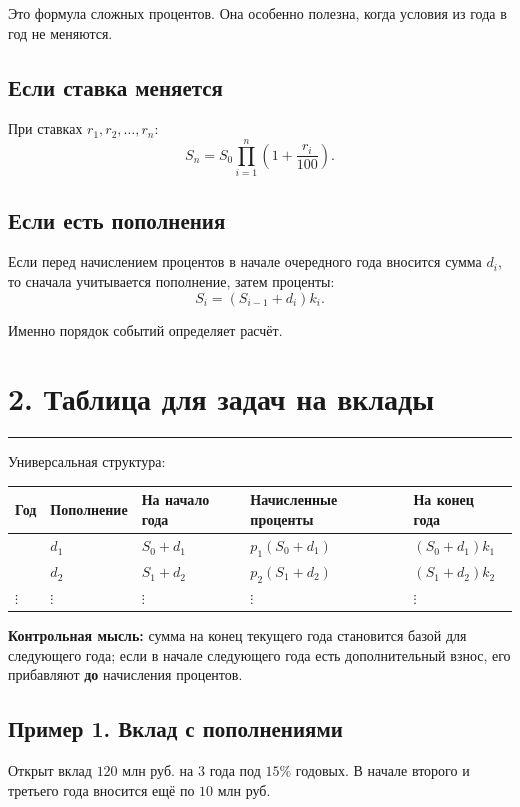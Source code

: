 \documentclass[a4paper,12pt]{article}
\newcommand{\sectionline}{\vspace{-0.4em}\textcolor{linegray}{\rule{\linewidth}{0.5pt}}\vspace{0.35em}}
\newcommand{\key}[1]{\textcolor{darkaccent}{\textbf{#1}}}
\begin{document}
Это формула сложных процентов. Она особенно полезна, когда условия из года в год не меняются.

\subsection*{Если ставка меняется}
При ставках $r_1,r_2,\ldots,r_n$:
\[
\boxed{S_n=S_0\prod_{i=1}^{n}\left(1+\frac{r_i}{100}\right).}
\]

\subsection*{Если есть пополнения}
Если перед начислением процентов в начале очередного года вносится сумма $d_i$, то сначала учитывается пополнение, затем проценты:
\[
\boxed{S_i=(S_{i-1}+d_i)k_i.}
\]

Именно порядок событий определяет расчёт.

\section*{2. Таблица для задач на вклады}
\sectionline

Универсальная структура:

\begin{center}
\begin{tabularx}{\linewidth}{>{\centering\arraybackslash}p{1.4cm} >{\centering\arraybackslash}p{2.3cm} >{\centering\arraybackslash}X >{\centering\arraybackslash}X >{\centering\arraybackslash}X}
\toprule
Год & Пополнение & На начало года & Начисленные проценты & На конец года \\
\midrule
1 & $d_1$ & $S_0+d_1$ & $p_1(S_0+d_1)$ & $(S_0+d_1)k_1$ \\
2 & $d_2$ & $S_1+d_2$ & $p_2(S_1+d_2)$ & $(S_1+d_2)k_2$ \\
$\vdots$ & $\vdots$ & $\vdots$ & $\vdots$ & $\vdots$ \\
\bottomrule
\end{tabularx}
\end{center}

\key{Контрольная мысль:} сумма на конец текущего года становится базой для следующего года; если в начале следующего года есть дополнительный взнос, его прибавляют \textbf{до} начисления процентов.

\subsection*{Пример 1. Вклад с пополнениями}
Открыт вклад $120$ млн руб. на $3$ года под $15\%$ годовых. В начале второго и третьего года вносится ещё по $10$ млн руб.
\end{document}

